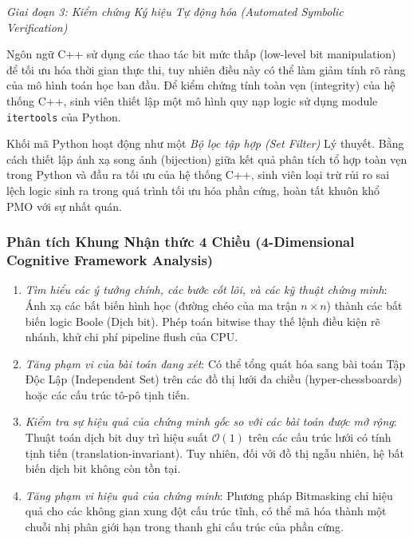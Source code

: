 \documentclass{article}
\begin{document}
\vspace{0.5em}\noindent\emph{Giai đoạn 3: Kiểm chứng Ký hiệu Tự động hóa (Automated Symbolic Verification)}

Ngôn ngữ C++ sử dụng các thao tác bit mức thấp (low-level bit manipulation) để tối ưu hóa thời gian thực thi, tuy nhiên điều này có thể làm giảm tính rõ ràng của mô hình toán học ban đầu. Để kiểm chứng tính toàn vẹn (integrity) của hệ thống C++, sinh viên thiết lập một mô hình quy nạp logic sử dụng module \texttt{itertools} của Python.

Khối mã Python hoạt động như một \textit{Bộ lọc tập hợp (Set Filter)} Lý thuyết. Bằng cách thiết lập ánh xạ song ánh (bijection) giữa kết quả phân tích tổ hợp toàn vẹn trong Python và đầu ra tối ưu của hệ thống C++, sinh viên loại trừ rủi ro sai lệch logic sinh ra trong quá trình tối ưu hóa phần cứng, hoàn tất khuôn khổ PMO với sự nhất quán.





\subsubsection*{Phân tích Khung Nhận thức 4 Chiều (4-Dimensional Cognitive Framework Analysis)}
\begin{enumerate}
 \item \textit{Tìm hiểu các ý tưởng chính, các bước cốt lõi, và các kỹ thuật chứng minh}: Ánh xạ các bất biến hình học (đường chéo của ma trận $n \times n$) thành các bất biến logic Boole (Dịch bit). Phép toán bitwise thay thế lệnh điều kiện rẽ nhánh, khử chi phí pipeline flush của CPU.
 \item \textit{Tăng phạm vi của bài toán đang xét}: Có thể tổng quát hóa sang bài toán Tập Độc Lập (Independent Set) trên các đồ thị lưới đa chiều (hyper-chessboards) hoặc các cấu trúc tô-pô tịnh tiến.
 \item \textit{Kiểm tra sự hiệu quả của chứng minh gốc so với các bài toán được mở rộng}: Thuật toán dịch bit duy trì hiệu suất $\mathcal{O}(1)$ trên các cấu trúc lưới có tính tịnh tiến (translation-invariant). Tuy nhiên, đối với đồ thị ngẫu nhiên, hệ bất biến dịch bit không còn tồn tại.
 \item \textit{Tăng phạm vi hiệu quả của chứng minh}: Phương pháp Bitmasking chỉ hiệu quả cho các không gian xung đột cấu trúc tĩnh, có thể mã hóa thành một chuỗi nhị phân giới hạn trong thanh ghi cấu trúc của phần cứng.
\end{enumerate}
\end{document}
